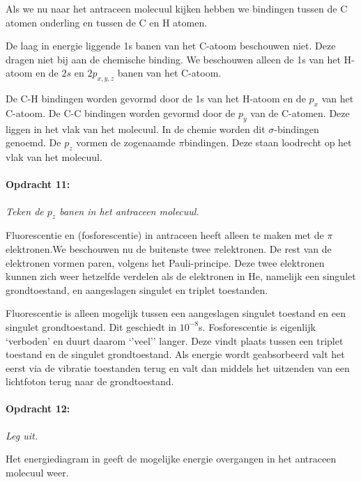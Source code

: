 Als we nu naar het antraceen molecuul kijken hebben we bindingen tussen
de C atomen onderling en tussen de C en H atomen.

De laag in energie liggende 1s banen van het C-atoom beschouwen niet.
Deze dragen niet bij aan de chemische binding. We beschouwen alleen
de 1s van het H-atoom en de $2s$ en $2p_{x,y,z}$ banen van het C-atoom.

De C-H bindingen worden gevormd door de 1s van het H-atoom en de $p_{x}$
van het C-atoom. De C-C bindingen worden gevormd door de $p_{y}$
van de C-atomen. Deze liggen in het vlak van het molecuul. In de chemie
worden dit $\sigma$-bindingen genoemd. De $p_{z}$ vormen de zogenaamde
$\pi$\textendash{}bindingen. Deze staan loodrecht op het vlak van
het molecuul.


\paragraph*{Opdracht 11:}

\emph{Teken de $p_{z}$ banen in het antraceen molecuul.}

Fluorescentie en (fosforescentie) in antraceen heeft alleen te maken
met de $\pi$\textendash{}elektronen.We beschouwen nu de buitenste
twee $\pi$\textendash{}elektronen. De rest van de elektronen vormen
paren, volgens het Pauli-principe. Deze twee elektronen kunnen zich
weer hetzelfde verdelen als de elektronen in He, namelijk een singulet
grondtoestand, en aangeslagen singulet en triplet toestanden.

Fluorescentie is alleen mogelijk tussen een aangeslagen singulet toestand
en een singulet grondtoestand. Dit geschiedt in $10^{-8}$s. Fosforescentie
is eigenlijk \textquoteleft{}verboden\textquoteright{} en duurt daarom
\textquoteleft{}\textquoteright{}veel\textquoteright{}\textquoteright{}
langer. Deze vindt plaats tussen een triplet toestand en de singulet
grondtoestand. Als energie wordt geabsorbeerd valt het eerst via de
vibratie toestanden terug en valt dan middels het uitzenden van een
lichtfoton terug naar de grondtoestand.


\paragraph*{Opdracht 12:}

\emph{Leg  uit.}

Het energiediagram in  geeft
de mogelijke energie overgangen in het antraceen molecuul weer.


